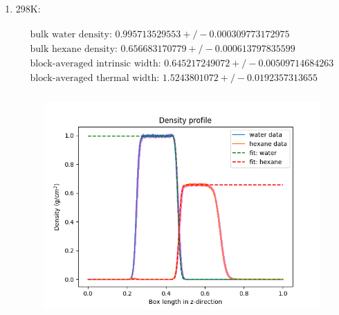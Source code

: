 \documentclass[12pt,reqno]{amsart}
\numberwithin{equation}{section}
\begin{document}
\begin{enumerate}
\item 298K:

\begin{align}
\begin{split}
\text{bulk water density: } 0.995713529553  +/- 0.000309773172975\\
\text{bulk hexane density: } 0.656683170779  +/- 0.000613797835599\\
\text{block-averaged intrinsic width: } 0.645217249072  +/- 0.00509714684263\\
\text{block-averaged thermal width: } 1.5243801072  +/- 0.0192357313655 \\
\end{split}
\end{align} 

\begin{figure}[H]
\centering
\includegraphics[scale=0.6]{interface_density_profile_full-298-1bead}
\end{figure}




\end{enumerate}
\end{document}
